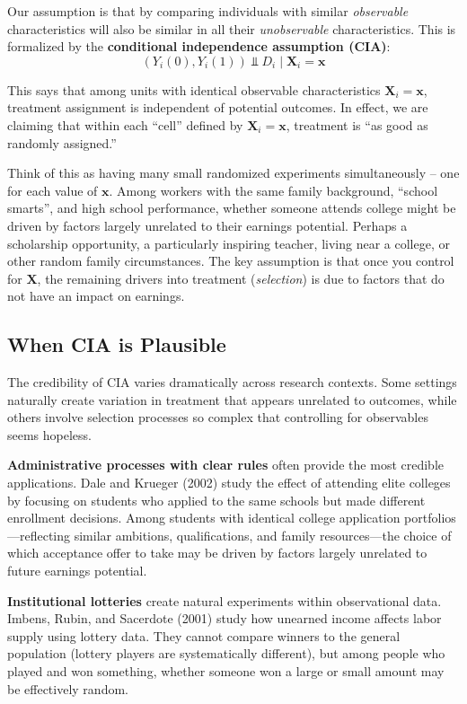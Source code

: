 \documentclass[12pt]{article}
\begin{document}
\begin{multicols}{2}
Our assumption is that by comparing individuals with similar \emph{observable} characteristics will also be similar in all their \emph{unobservable} characteristics.
This is formalized by the \textbf{conditional independence assumption (CIA)}:
$$(Y_i(0), Y_i(1)) \Perp D_i \mid \bm{X}_i = \bm{x}$$

This says that among units with identical observable characteristics $\bm{X}_i = \bm{x}$, treatment assignment is independent of potential outcomes.
In effect, we are claiming that within each ``cell'' defined by $\bm{X}_i = \bm{x}$, treatment is ``as good as randomly assigned.''

Think of this as having many small randomized experiments simultaneously -- one for each value of $\bm{x}$.
Among workers with the same family background, ``school smarts'', and high school performance, whether someone attends college might be driven by factors largely unrelated to their earnings potential.
Perhaps a scholarship opportunity, a particularly inspiring teacher, living near a college, or other random family circumstances.
The key assumption is that once you control for $\bm{X}$, the remaining drivers into treatment (\emph{selection}) is due to factors that do not have an impact on earnings.

\subsection*{When CIA is Plausible}

The credibility of CIA varies dramatically across research contexts.
Some settings naturally create variation in treatment that appears unrelated to outcomes, while others involve selection processes so complex that controlling for observables seems hopeless.

\textbf{Administrative processes with clear rules} often provide the most credible applications.
Dale and Krueger (2002) study the effect of attending elite colleges by focusing on students who applied to the same schools but made different enrollment decisions.
Among students with identical college application portfolios---reflecting similar ambitions, qualifications, and family resources---the choice of which acceptance offer to take may be driven by factors largely unrelated to future earnings potential.

\textbf{Institutional lotteries} create natural experiments within observational data.
Imbens, Rubin, and Sacerdote (2001) study how unearned income affects labor supply using lottery data.
They cannot compare winners to the general population (lottery players are systematically different), but among people who played and won something, whether someone won a large or small amount may be effectively random.


\end{multicols}
\end{document}
